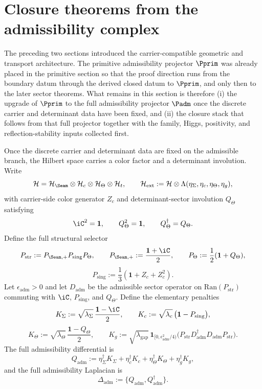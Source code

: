 \section{Closure theorems from the admissibility complex}
\label{sec:closure-theorems}

The preceding two sections introduced the carrier-compatible geometric and transport architecture.
The primitive admissibility projector $\Pprim$ was already placed in the primitive section so
that the proof direction runs from the boundary datum through the derived closed datum to $\Pprim$, and only then to the later
sector theorems. What remains in this section is therefore (i) the upgrade of $\Pprim$ to the
full admissibility projector $\Padm$ once the discrete carrier and determinant data have been
fixed, and (ii) the closure stack that follows from that full projector together with the family,
Higgs, positivity, and reflection-stability inputs collected first.

\begin{definition}
\label{def:full-admissibility-complex}
Once the discrete carrier and determinant data are fixed on the admissible branch, the Hilbert
space carries a color factor and a determinant involution. Write
\[
\mathcal H=\mathcal H_{\Seam}\otimes\mathcal H_c\otimes\mathcal H_\Theta\otimes\mathcal H_t,
\qquad
\mathcal H_{\mathrm{ext}}
:=
\mathcal H\otimes\Lambda(\eta_\Sigma,\eta_c,\eta_\Theta,\eta_g),
\]
with carrier-side color generator $Z_c$ and determinant-sector involution $Q_\Theta$ satisfying
\[
\iC^2=\mathbf 1,
\qquad
Q_\Theta^2=\mathbf 1,
\qquad
Q_\Theta^\dagger=Q_\Theta.
\]
Define the full structural selector
\[
P_{\mathrm{str}}:=P_{\Seam,+}P_{\mathrm{sing}}P_\Theta,
\qquad
P_{\Seam,+}:=\frac{\mathbf 1+\iC}{2},
\qquad
P_\Theta:=\frac12(\mathbf 1+Q_\Theta),
\]
\[
P_{\mathrm{sing}}:=\frac13(\mathbf 1+Z_c+Z_c^2).
\]
Let $\epsilon_{\mathrm{adm}}>0$ and let $D_{\mathrm{adm}}$ be the admissible sector operator on
$\mathrm{Ran}(P_{\mathrm{str}})$ commuting with $\iC$, $P_{\mathrm{sing}}$, and $Q_\Theta$.
Define the elementary penalties
\[
K_\Sigma:=\sqrt{\lambda_\Sigma}\,\frac{\mathbf 1-\iC}{2},
\qquad
K_c:=\sqrt{\lambda_c}\,\bigl(\mathbf 1-P_{\mathrm{sing}}\bigr),
\]
\[
K_\Theta:=\sqrt{\lambda_\Theta}\,\frac{\mathbf 1-Q_\Theta}{2},
\qquad
K_g:=\sqrt{\lambda_{\mathrm{gap}}}\,\mathbf 1_{[0,\epsilon_{\mathrm{adm}}^2/4)}\!\bigl(P_{\mathrm{str}}D_{\mathrm{adm}}^\dagger D_{\mathrm{adm}}P_{\mathrm{str}}\bigr).
\]
The full admissibility differential is
\[
Q_{\mathrm{adm}}
:=
\eta_\Sigma^\dagger K_\Sigma
+\eta_c^\dagger K_c
+\eta_\Theta^\dagger K_\Theta
+\eta_g^\dagger K_g,
\]
and the full admissibility Laplacian is
\[
\Delta_{\mathrm{adm}}:=\{Q_{\mathrm{adm}},Q_{\mathrm{adm}}^\dagger\}.
\]
\end{definition}

